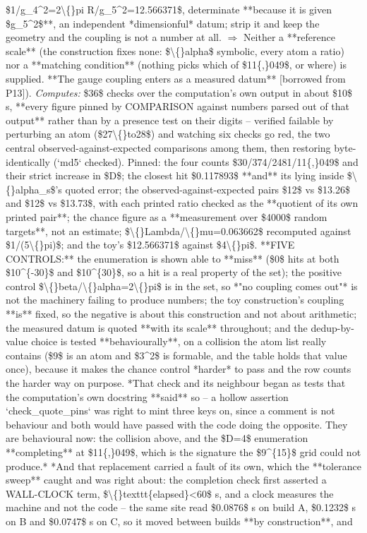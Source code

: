 \begin{description}
\$1/g\_4\textasciicircum{}2=2\textbackslash\{\}pi R/g\_5\textasciicircum{}2=12.566371\$, determinate **because it is given \$g\_5\textasciicircum{}2\$**, an independent *dimensionful* datum; strip it and keep the geometry and the coupling is not a number at all. \ensuremath{\Rightarrow} Neither a **reference scale** (the construction fixes none: \$\textbackslash\{\}alpha\$ symbolic, every atom a ratio) nor a **matching condition** (nothing picks which of \$11\{,\}049\$, or where) is supplied. **The gauge coupling enters as a measured datum** [borrowed from P13]). 
\emph{Computes:} \$36\$ checks over the computation's own output in about \$10\$ s, **every figure pinned by COMPARISON against numbers parsed out of that output** rather than by a presence test on their digits -- verified failable by perturbing an atom (\$27\textbackslash\{\}to28\$) and watching six checks go red, the two central observed-against-expected comparisons among them, then restoring byte-identically (`md5` checked). Pinned: the four counts \$30/374/2481/11\{,\}049\$ and their strict increase in \$D\$; the closest hit \$0.117893\$ **and** its lying inside \$\textbackslash\{\}alpha\_s\$'s quoted error; the observed-against-expected pairs \$12\$ vs \$13.26\$ and \$12\$ vs \$13.73\$, with each printed ratio checked as the **quotient of its own printed pair**; the chance figure as a **measurement over \$4000\$ random targets**, not an estimate; \$\textbackslash\{\}Lambda/\textbackslash\{\}mu=0.063662\$ recomputed against \$1/(5\textbackslash\{\}pi)\$; and the toy's \$12.566371\$ against \$4\textbackslash\{\}pi\$. **FIVE CONTROLS:** the enumeration is shown able to **miss** (\$0\$ hits at both \$10\textasciicircum{}\{-30\}\$ and \$10\textasciicircum{}\{30\}\$, so a hit is a real property of the set); the positive control \$\textbackslash\{\}beta/\textbackslash\{\}alpha=2\textbackslash\{\}pi\$ is in the set, so *"no coupling comes out"* is not the machinery failing to produce numbers; the toy construction's coupling **is** fixed, so the negative is about this construction and not about arithmetic; the measured datum is quoted **with its scale** throughout; and the dedup-by-value choice is tested **behaviourally**, on a collision the atom list really contains (\$9\$ is an atom and \$3\textasciicircum{}2\$ is formable, and the table holds that value once), because it makes the chance control *harder* to pass and the row counts the harder way on purpose.  *That check and its neighbour began as tests that the computation's own docstring **said** so -- a hollow assertion `check\_quote\_pins` was right to mint three keys on, since a comment is not behaviour and both would have passed with the code doing the opposite. They are behavioural now: the collision above, and the \$D=4\$ enumeration **completing** at \$11\{,\}049\$, which is the signature the \$9\textasciicircum{}\{15\}\$ grid could not produce.*  *And that replacement carried a fault of its own, which the **tolerance sweep** caught and was right about: the completion check first asserted a WALL-CLOCK term, \$\textbackslash\{\}texttt\{elapsed\}<60\$ s, and a clock measures the machine and not the code -- the same site read \$0.0876\$ s on build A, \$0.1232\$ s on B and \$0.0747\$ s on C, so it moved between builds **by construction**, and 
\end{description}
